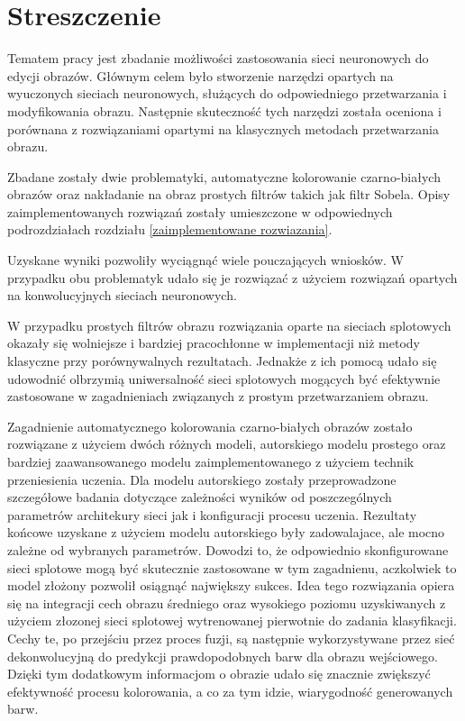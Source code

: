 \section*{Streszczenie}

  Tematem pracy jest zbadanie możliwości zastosowania sieci neuronowych do
  edycji obrazów. Głównym celem było stworzenie narzędzi opartych na wyuczonych
  sieciach neuronowych, służących do odpowiedniego przetwarzania i
  modyfikowania obrazu. Następnie skuteczność tych narzędzi została oceniona i
  porównana z rozwiązaniami opartymi na klasycznych metodach przetwarzania obrazu.

  Zbadane zostały dwie problematyki, automatyczne kolorowanie czarno-białych obrazów
  oraz nakładanie na obraz prostych filtrów takich jak filtr Sobela. Opisy
  zaimplementowanych rozwiązań zostały umieszczone w odpowiednych podrozdziałach
  rozdziału \ref{zaimplementowane rozwiazania}.

  Uzyskane wyniki pozwoliły wyciągnąć wiele pouczających wniosków. W przypadku obu
  problematyk udało się je rozwiązać z użyciem rozwiązań opartych na konwolucyjnych
  sieciach neuronowych.

  W przypadku prostych filtrów obrazu rozwiązania
  oparte na sieciach splotowych okazały się wolniejsze i bardziej pracochłonne w
  implementacji niż metody klasyczne przy porównywalnych rezultatach. Jednakże
  z ich pomocą udało się udowodnić olbrzymią uniwersalność sieci splotowych
  mogących być efektywnie zastosowane w zagadnieniach związanych z prostym
  przetwarzaniem obrazu.

  Zagadnienie automatycznego kolorowania czarno-białych
  obrazów zostało rozwiązane z użyciem dwóch różnych modeli, autorskiego modelu
  prostego oraz bardziej zaawansowanego modelu zaimplementowanego z użyciem technik
  przeniesienia uczenia. Dla modelu autorskiego zostały przeprowadzone szczegółowe
  badania dotyczące zależności wyników od poszczególnych parametrów architekury
  sieci jak i konfiguracji procesu uczenia. Rezultaty końcowe uzyskane z użyciem
  modelu autorskiego były zadowalajace, ale mocno zależne od wybranych parametrów.
  Dowodzi to, że odpowiednio skonfigurowane sieci splotowe mogą być skutecznie
  zastosowane w tym zagadnienu, aczkolwiek to model złożony pozwolił osiągnąć
  największy sukces.
  Idea tego rozwiązania opiera się na integracji cech obrazu średniego oraz wysokiego
  poziomu uzyskiwanych z użyciem złozonej sieci splotowej wytrenowanej pierwotnie do
  zadania klasyfikacji. Cechy te, po przejściu przez proces fuzji, są następnie
  wykorzystywane przez sieć dekonwolucyjną do predykcji prawdopodobnych barw dla
  obrazu wejściowego. Dzięki tym dodatkowym informacjom o obrazie udało się
  znacznie zwiększyć efektywność procesu kolorowania, a co za tym idzie,
  wiarygodność generowanych barw.

